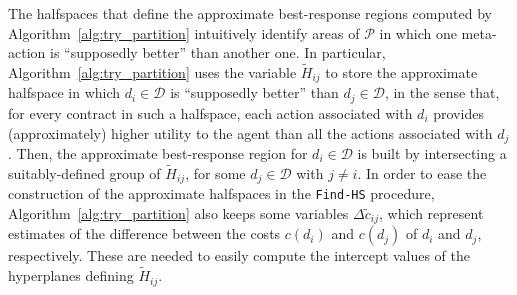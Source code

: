 The halfspaces that define the approximate best-response regions computed by Algorithm~\ref{alg:try_partition} intuitively identify areas of $\mathcal{P}$ in which one meta-action is ``supposedly better'' than another one.
%
In particular, Algorithm~\ref{alg:try_partition} uses the variable $\widetilde H_{ij}$ to store the approximate halfspace in which $d_i \in \mathcal{D}$ is ``supposedly better'' than $d_j \in \mathcal{D}$, in the sense that, for every contract in such a halfspace, each action associated with $d_i$ provides (approximately) higher utility to the agent than all the actions associated with $d_j$.
%
Then, the approximate best-response region for $d_i \in \mathcal{D}$ is built by intersecting a suitably-defined group of $\widetilde H_{ij}$, for some $d_j \in \mathcal{D}$ with $j \neq i$.
%
In order to ease the construction of the approximate halfspaces in the \texttt{Find-HS} procedure, Algorithm~\ref{alg:try_partition} also keeps some variables $\Delta \widetilde{c}_{ij}$, which represent estimates of the difference between the costs $c(d_i)$ and $c(d_j)$ of $d_i$ and $d_j$, respectively.
%
These are needed to easily compute the intercept values of the hyperplanes defining $\widetilde H_{ij}$.
%
%
%
%
